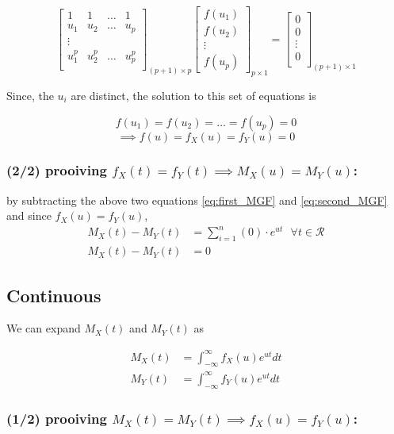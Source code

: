 \documentclass[openany]{book}
\begin{document}
	\[
	\left[ \begin{matrix}
		1 & 1 & \dots & 1 \\
		u_1 & u_2 & \dots & u_p \\
		\vdots \\
		u_1^p & u_2^p & \dots & u_p^p \\
	\end{matrix} \right]_{(p+1)\times p}
	\left[ \begin{matrix}
		f(u_1)\\
		f(u_2)\\
		\vdots \\
		f(u_p)
	\end{matrix} \right]_{p \times 1}
	=
	\left[ \begin{matrix}
		0 \\
		0 \\
		\vdots \\ 
		0\\
	\end{matrix}\right]_{(p+1) \times 1}
	\]
	
	Since, the $u_i$ are distinct, the solution to this set of equations is 
	
	\[ f(u_1)= f(u_2) = \dots = f(u_p) = 0 \]
	\[ \implies f(u) = f_X(u) = f_Y(u) = 0 \]
	
	\subsubsection*{(2/2) prooiving $f_X(t) = f_Y(t) \implies M_X(u) = M_Y(u)$:}
	by subtracting the above two equations \ref{eq:first_MGF} and \ref{eq:second_MGF} and since $f_X(u) = f_Y(u)$,
	\begin{align*}
		M_X(t) - M_Y(t) &=\sum_{i=1}^{n}( 0 ) \cdot e^{ut} \text{ }\forall t \in \mathcal{R}\\ 
		M_X(t) - M_Y(t) &= 0
	\end{align*}
	
	
	\subsection*{Continuous}
	We can expand $M_X(t)$ and $M_Y(t)$ as 
	
	\begin{align}
		M_X(t) &= \int_{-\infty}^{\infty} f_X(u) e^{ut} dt \label{eq:first_MGF}\\
		M_Y(t) &= \int_{-\infty}^{\infty} f_Y(u) e^{ut} dt \label{eq:second_MGF}
	\end{align}
	
	\subsubsection*{(1/2) prooiving $M_X(t) = M_Y(t) \implies f_X(u) = f_Y(u)$:}
	
\end{document}
